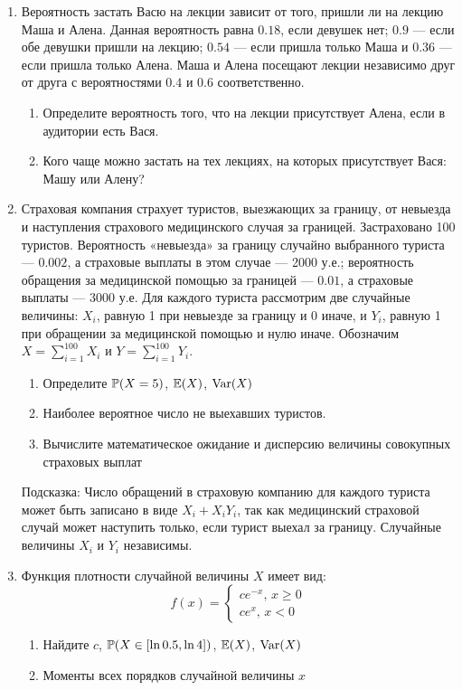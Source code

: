 \documentclass[12pt, a4paper]{article}\usepackage[]{graphicx}\usepackage[]{color}
\begin{document}
\begin{enumerate}
\item Вероятность застать Васю на лекции зависит от того, пришли ли на лекцию Маша и Алена. Данная вероятность равна $0.18$, если девушек нет; $0.9$ — если обе девушки пришли на лекцию; $0.54$ — если пришла только Маша и $0.36$ — если пришла только Алена. Маша и Алена посещают лекции независимо друг от друга с вероятностями $0.4$ и $0.6$ соответственно.
\begin{enumerate}
\item Определите вероятность того, что на лекции присутствует Алена, если в аудитории есть Вася.
\item Кого чаще можно застать на тех лекциях, на которых присутствует Вася: Машу или Алену?
\end{enumerate}


\item Страховая компания страхует туристов, выезжающих за границу, от невыезда и наступления страхового медицинского случая за границей. Застраховано 100 туристов. Вероятность «невыезда» за границу случайно выбранного туриста — $0.002$, а страховые выплаты в этом случае — 2000 у.е.; вероятность обращения за медицинской помощью за границей — $0.01$, а страховые выплаты — 3000 у.е. Для каждого туриста рассмотрим две случайные величины: $X_i$, равную 1 при невыезде за границу и 0 иначе, и $Y_i$, равную 1 при обращении за медицинской помощью и нулю иначе. Обозначим $X=\sum_{i=1}^{100}X_i$ и $Y=\sum_{i=1}^{100}Y_i$.
\begin{enumerate}
\item Определите $\P(X=5)$, $\E(X)$, $\Var(X)$
\item Наиболее вероятное число не выехавших туристов.
\item Вычислите математическое ожидание и дисперсию величины совокупных страховых выплат
\end{enumerate}
Подсказка: Число обращений в страховую компанию для каждого туриста может быть записано в виде $X_i+X_i Y_i$, так как медицинский страховой случай может наступить только, если турист выехал за границу. Случайные величины $X_i$ и $Y_i$ независимы.

\item Функция плотности случайной величины $X$ имеет вид:
\begin{equation}
f(x)=\begin{cases}
ce^{-x}, \, x\geq 0 \\
ce^x, \, x<0
\end{cases}
\end{equation}
\begin{enumerate}
\item Найдите $c$, $\P(X \in [\ln 0.5,\ln 4])$, $\E(X)$, $\Var(X)$
\item Моменты всех порядков случайной величины $x$
\end{enumerate}


\end{enumerate}
\end{document}
